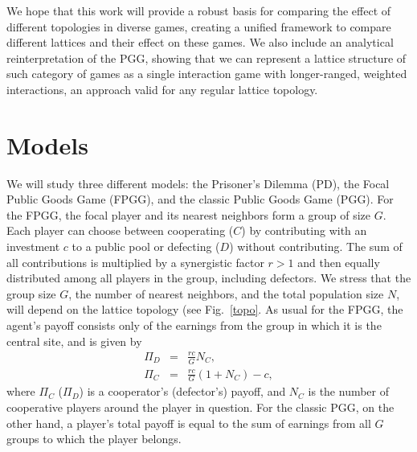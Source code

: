 \documentclass[5p,review]{elsarticle}
\begin{document}
We hope that this work will provide a robust basis for comparing the effect of different topologies in diverse games, creating a unified framework to compare different lattices and their effect on these games. We also include an analytical reinterpretation of the PGG, showing that we can represent a lattice structure of such category of games as a single interaction game with longer-ranged, weighted interactions, an approach valid for any regular lattice topology.

\section{Models} 
\label{model}
We will study three different models: the Prisoner's Dilemma (PD), the Focal Public Goods Game (FPGG), and the classic Public Goods Game (PGG).
%
For the FPGG, the focal player and its nearest neighbors form a group of size $G$. Each player can choose between cooperating ($C$) by contributing with an investment $c$ to a public pool or defecting  ($D$) without contributing. The sum of all contributions is multiplied by a synergistic factor $r>1$ and then equally distributed among all players in the group, including defectors. We stress that the group size $G$, the number of nearest neighbors, and the total population size $N$, will depend on the lattice topology (see Fig.~\ref{topo}. 
%
As usual for the FPGG, the agent's payoff consists only of the earnings from the group in which it is the central site, and is given by
\begin{eqnarray}
\Pi_D&=&\frac{rc}{G} N_C, \label{payD}\\
\Pi_C&=&\frac{rc}{G} (1+N_C) -c, \label{payC}
\end{eqnarray}
where $\Pi_C$ ($\Pi_D$) is a cooperator's (defector's) payoff, and $N_C$ is the number of cooperative players around the player in question.  
%
For the classic PGG, on the other hand, a player's total payoff is equal to the sum of earnings from all $G$ groups to which the player belongs. 
%
\end{document}
